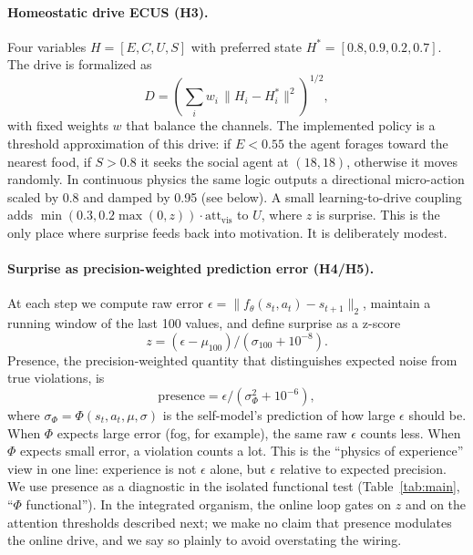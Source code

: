 \documentclass[11pt,a4paper]{article}
\begin{document}
\paragraph{Homeostatic drive ECUS (H3).} Four variables $H=[E, C, U, S]$ with preferred state $H^*=[0.8, 0.9, 0.2, 0.7]$. The drive is formalized as
\begin{equation}
D = \left(\sum_i w_i \, \|H_i - H^*_i\|^2 \right)^{1/2},
\end{equation}
with fixed weights $w$ that balance the channels. The implemented policy is a threshold approximation of this drive: if $E < 0.55$ the agent forages toward the nearest food, if $S > 0.8$ it seeks the social agent at $(18,18)$, otherwise it moves randomly. In continuous physics the same logic outputs a directional micro-action scaled by 0.8 and damped by 0.95 (see below). A small learning-to-drive coupling adds $\min(0.3, 0.2\max(0,z)) \cdot \mathrm{att}_{\mathrm{vis}}$ to $U$, where $z$ is surprise. This is the only place where surprise feeds back into motivation. It is deliberately modest.

\paragraph{Surprise as precision-weighted prediction error (H4/H5).} At each step we compute raw error $\epsilon = \|f_\theta(s_t,a_t) - s_{t+1}\|_2$, maintain a running window of the last 100 values, and define surprise as a z-score
\begin{equation}
z = (\epsilon - \mu_{100}) / (\sigma_{100}+10^{-8}).
\end{equation}
Presence, the precision-weighted quantity that distinguishes expected noise from true violations, is
\begin{equation}
\mathrm{presence} = \epsilon / (\sigma_\Phi^2 + 10^{-6}),
\end{equation}
where $\sigma_\Phi = \Phi(s_t, a_t, \mu, \sigma)$ is the self-model's prediction of how large $\epsilon$ should be. When $\Phi$ expects large error (fog, for example), the same raw $\epsilon$ counts less. When $\Phi$ expects small error, a violation counts a lot. This is the ``physics of experience'' view in one line: experience is not $\epsilon$ alone, but $\epsilon$ relative to expected precision. We use presence as a diagnostic in the isolated functional test (Table~\ref{tab:main}, ``$\Phi$ functional''). In the integrated organism, the online loop gates on $z$ and on the attention thresholds described next; we make no claim that presence modulates the online drive, and we say so plainly to avoid overstating the wiring.
\end{document}
